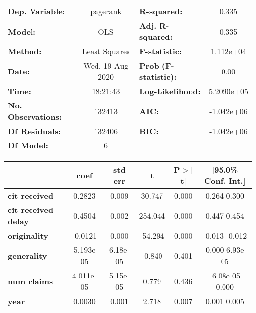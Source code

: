 \begin{center}
\begin{tabular}{lclc}
\toprule
\textbf{Dep. Variable:}     &     pagerank     & \textbf{  R-squared:         } &        0.335      \\
\textbf{Model:}             &       OLS        & \textbf{  Adj. R-squared:    } &        0.335      \\
\textbf{Method:}            &  Least Squares   & \textbf{  F-statistic:       } &    1.112e+04      \\
\textbf{Date:}              & Wed, 19 Aug 2020 & \textbf{  Prob (F-statistic):} &        0.00       \\
\textbf{Time:}              &     18:21:43     & \textbf{  Log-Likelihood:    } &    5.2090e+05     \\
\textbf{No. Observations:}  &      132413      & \textbf{  AIC:               } &    -1.042e+06     \\
\textbf{Df Residuals:}      &      132406      & \textbf{  BIC:               } &    -1.042e+06     \\
\textbf{Df Model:}          &           6      & \textbf{                     } &                   \\
\bottomrule
\end{tabular}
\begin{tabular}{lccccc}
                            & \textbf{coef} & \textbf{std err} & \textbf{t} & \textbf{P$>$$|$t$|$} & \textbf{[95.0\% Conf. Int.]}  \\
\midrule
\textbf{cit received}       &       0.2823  &        0.009     &    30.747  &         0.000        &         0.264     0.300       \\
\textbf{cit received delay} &       0.4504  &        0.002     &   254.044  &         0.000        &         0.447     0.454       \\
\textbf{originality}        &      -0.0121  &        0.000     &   -54.294  &         0.000        &        -0.013    -0.012       \\
\textbf{generality}         &   -5.193e-05  &     6.18e-05     &    -0.840  &         0.401        &        -0.000  6.93e-05       \\
\textbf{num claims}         &    4.011e-05  &     5.15e-05     &     0.779  &         0.436        &     -6.08e-05     0.000       \\
\textbf{year}               &       0.0030  &        0.001     &     2.718  &         0.007        &         0.001     0.005       \\

\end{tabular}
\end{center}

